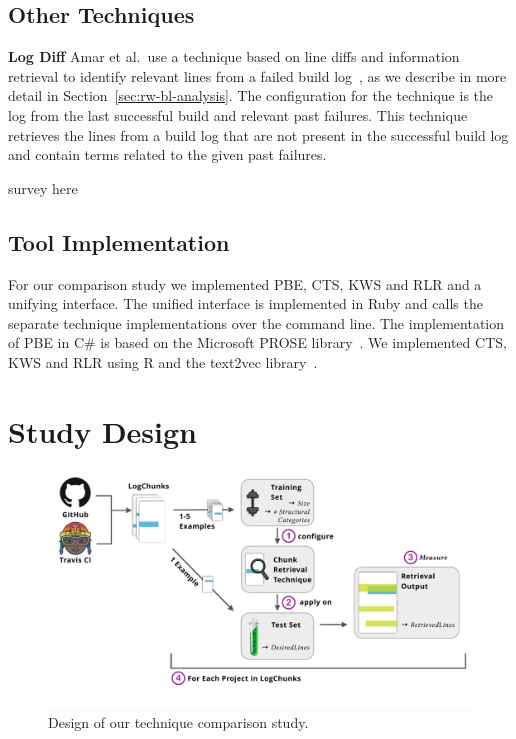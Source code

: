 
\subsection{Other Techniques}

\noindent
\textbf{Log Diff}
Amar et al.\ use a technique based on line diffs and information
retrieval to identify relevant lines from a failed build
log~\cite{amar2019mining}, as we describe in more detail in
Section~\ref{sec:rw-bl-analysis}.
The configuration for the technique
is the log from the last successful build and relevant past failures.
This technique retrieves the lines from a build log that are not
present in the successful build log and contain terms related to the
given past failures.

survey here

\subsection{Tool Implementation}
For our comparison study we implemented PBE, CTS, KWS and RLR and a
unifying interface.
The unified interface is implemented in Ruby and
calls the separate technique implementations over the command line.
The implementation of PBE in C\# is based on the Microsoft PROSE
library~\cite{prose2019webpage}.
We implemented CTS, KWS and RLR using
R and the text2vec library~\cite{text2vec2019webpage}.


\section{Study Design}
\label{sec:study}

\begin{figure}[tb]
	\centering
	\includegraphics[width=\textwidth, trim={0.5cm 1.3cm 0.2cm 0.3cm},
  clip]{img/study.pdf}
	\caption{Design of our technique comparison study.}
	\label{fig:study}
\end{figure}

